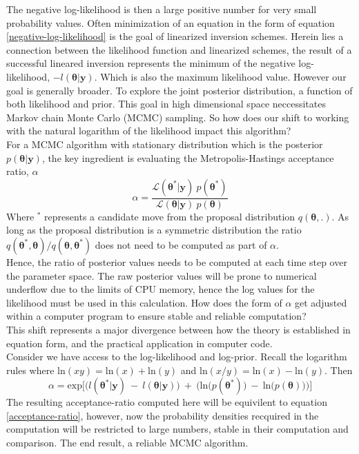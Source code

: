 \begin{tcolorbox}

The negative log-likelihood is then a large positive number for very small probability values. Often minimization of an equation in the form of equation \ref{negative-log-likelihood} is the goal of linearized inversion schemes. Herein lies a connection between the likelihood function and linearized schemes, the result of a successful lineared inversion represents the minimum of the negative log-likelihood, $-l(\bm{\theta}|\bm{y})$. Which is also the maximum likelihood value. However our goal is generally broader. To explore the joint posterior distribution, a function of both likelihood and prior. This goal in high dimensional space neccessitates Markov chain Monte Carlo (MCMC) sampling. So how does our shift to working with the natural logarithm of the likelihood impact this algorithm? \\

For a MCMC algorithm with stationary distribution which is the posterior $p(\bm{\theta}|\bm{y})$, the key ingredient is evaluating the Metropolis-Hastings acceptance ratio, $\alpha$
\begin{equation}
\alpha = \frac{\mathcal{L}(\bm{\theta^*}|\bm{y})\ p(\bm{\theta^*})}{\mathcal{L}(\bm{\theta}|\bm{y})\ p(\bm{\theta})}
\label{acceptance-ratio}
\end{equation}
Where $^*$ represents a candidate move from the proposal distribution $q(\bm{\theta},.)$. As long as the proposal distribution is a symmetric distribution the ratio $q(\bm{\theta^*},\bm{\theta})/q(\bm{\theta},\bm{\theta^*})$ does not need to be computed as part of $\alpha$.\\

Hence, the ratio of posterior values needs to be computed at each time step over the parameter space. The raw posterior values will be prone to numerical underflow due to the limits of CPU memory, hence the log values for the likelihood must be used in this calculation. How does the form of $\alpha$ get adjusted within a computer program to ensure stable and reliable computation?\\

This shift represents a major divergence between how the theory is established in equation form, and the practical application in computer code.\\

Consider we have access to the log-likelihood and log-prior. Recall the logarithm rules where $\text{ln}(xy) = \text{ln}(x)+\text{ln}(y)$ and $\text{ln}(x/y) = \text{ln}(x)-\text{ln}(y)$. Then
\begin{equation}
\alpha = \text{exp}\Big[\Big(l(\bm{\theta^*}|\bm{y})\ -\ l(\bm{\theta}|\bm{y})\Big)\ +\ \Big(\text{ln}\big(p(\bm{\theta^*})\big)\ -\ \text{ln}\big(p(\bm{\theta})\big)\Big)\Big]
\label{stable-acceptance-ratio}
\end{equation}
The resulting acceptance-ratio computed here will be equivilent to equation \ref{acceptance-ratio}, however, now the probability densities recquired in the computation will be restricted to large numbers, stable in their computation and comparison. The end result, a reliable MCMC algorithm.\\


\end{tcolorbox}
